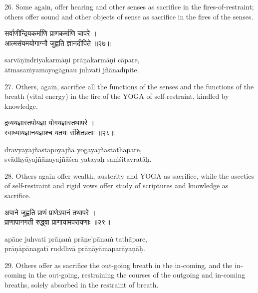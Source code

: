 26. Some again, offer hearing and other senses as sacrifice in the
fires-of-restraint; others offer sound and other objects of sense as sacrifice
in the fires of the senses.

\begin{gitaverse}
सर्वाणीन्द्रियकर्माणि प्राणकर्माणि चापरे । \\
आत्मसंयमयोगाग्नौ जुह्वति ज्ञानदीपिते ॥२७॥
\end{gitaverse}

\begin{transliteration}
sarvāṇīndriyakarmāṇi prāṇakarmāṇi cāpare, \\
ātmasaṁyamayogāgnau juhvati jñānadīpite.
\end{transliteration}

27. Others, again, sacrifice all the functions of the senses and the functions
of the breath (vital energy) in the fire of the YOGA of self-restraint, kindled
by knowledge.

\begin{gitaverse}
द्रव्ययज्ञास्तपोयज्ञा योगयज्ञास्तथापरे । \\
स्वाध्यायज्ञानयज्ञाश्च यतयः संशितव्रताः ॥२८॥
\end{gitaverse}

\begin{transliteration}
dravyayajñāstapoyajñā yogayajñāstathāpare, \\
svādhyāyajñānayajñāśca yatayaḥ saṁśitavratāḥ.
\end{transliteration}

28. Others again offer wealth, austerity and YOGA as sacrifice, while the
ascetics of self-restraint and rigid vows offer study of scriptures and
knowledge as sacrifice.

\begin{gitaverse}
अपाने जुह्वति प्राणं प्राणेऽपानं तथापरे । \\
प्राणापानगती रुद्ध्वा प्राणायामपरायणाः ॥२९॥
\end{gitaverse}

\begin{transliteration}
apāne juhvati prāṇaṁ prāṇe'pānaṁ tathāpare, \\
prāṇāpānagatī ruddhvā prāṇāyāmaparāyaṇāḥ.
\end{transliteration}

29. Others offer as sacrifice the out-going breath in the in-coming, and the
in-coming in the out-going, restraining the courses of the outgoing and
in-coming breaths, solely absorbed in the restraint of breath.

